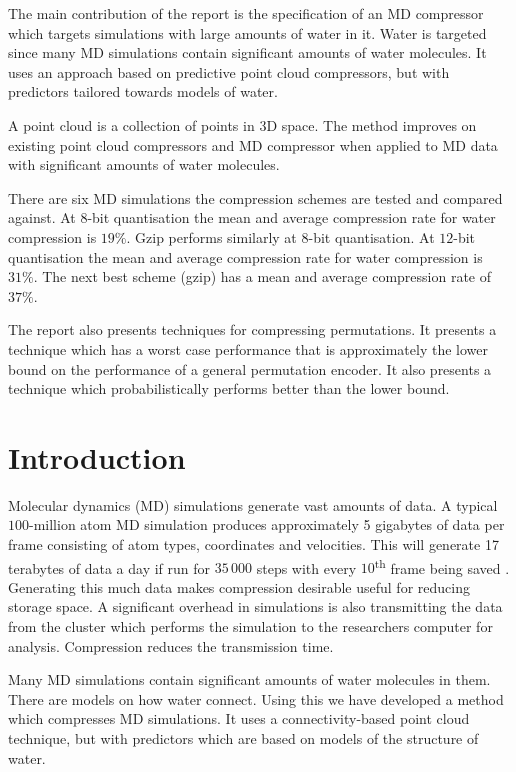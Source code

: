 \documentclass[a4paper]{report}
\begin{document}
The main contribution of the report is the specification of an MD compressor
which targets simulations with large amounts of water in it. Water is targeted
since many MD simulations contain significant amounts of water molecules. It
uses an approach based on predictive point cloud compressors, but with
predictors tailored towards models of water.

A point cloud is a collection of points in 3D space. The method improves on
existing point cloud compressors \citep{gumholdcomp,devillers2000gci} and MD
compressor \citep{omeltchenko2000sls} when applied to MD data with significant
amounts of water molecules.

There are six MD simulations the compression schemes are tested and compared
against. At $8$-bit quantisation the mean and average compression rate for
water compression is $19\%$. Gzip performs similarly at $8$-bit
quantisation. At $12$-bit quantisation the mean and average compression rate
for water compression is $31\%$. The next best scheme (gzip) has a mean and
average compression rate of $37\%$.

The report also presents techniques for compressing permutations. It presents
a technique which has a worst case performance that is approximately the lower
bound on the performance of a general permutation encoder. It also presents a
technique which probabilistically performs better than the lower bound.

\tableofcontents

\chapter{Introduction}

Molecular dynamics (MD) simulations generate vast amounts of data. A typical
$100$-million atom MD simulation produces approximately 5 gigabytes of data
per frame consisting of atom types, coordinates and velocities. This will
generate 17 terabytes of data a day if run for $35\,000$ steps with every
$10$\textsuperscript{th} frame being saved
\citep{omeltchenko2000sls}. Generating this much data makes compression
desirable useful for reducing storage space. A significant overhead in
simulations is also transmitting the data from the cluster which performs the
simulation to the researchers computer for analysis. Compression reduces the
transmission time.

Many MD simulations contain significant amounts of water molecules in
them. There are models on how water connect. Using this we have developed a
method which compresses MD simulations. It uses a connectivity-based point
cloud technique, but with predictors which are based on models of the
structure of water.
\end{document}
